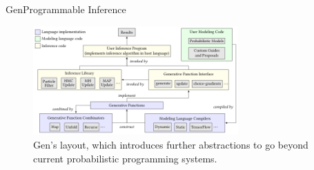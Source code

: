 \documentclass[AERbeamer%
              ,optEnglish%
              ,optBiber%
              ,optBibstyleAlphabetic%
              ,optBeamerClassicFormat%
              ]{AERlatex}%
\begin{document}
\begin{frame}[c]{Gen}{Programmable Inference}
    \centering
    \begin{figure}
        \centering
        \includegraphics[width=0.7\textwidth]{GenSpecialArchitecture.png}
        \caption{Gen's layout, which introduces further abstractions to go beyond current
                 probabilistic programming systems.}           
    \end{figure}
\end{frame}
\end{document}
